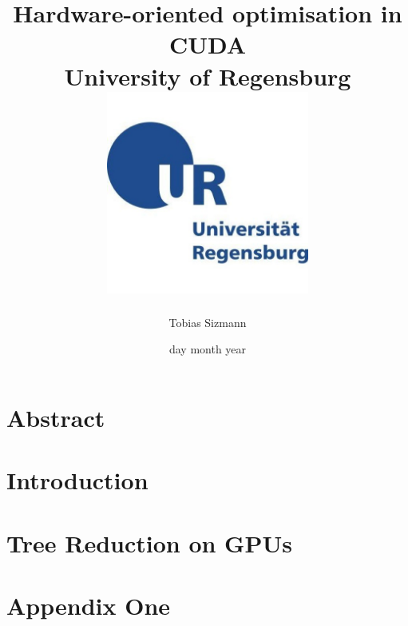 \documentclass[12pt, twoside]{report}
\title{
    {Hardware-oriented optimisation in CUDA} \\
    {\large University of Regensburg} \\
    {\includegraphics[width = 0.5\textwidth]{ur_logo.jpg}}
}
\author{Tobias Sizmann}
\date{day month year}
\begin{document}
\maketitle

\chapter*{Abstract}

\tableofcontents

\chapter{Introduction}


\chapter{Tree Reduction on GPUs}


\appendix
\chapter{Appendix One}


\printbibliography
\end{document}
